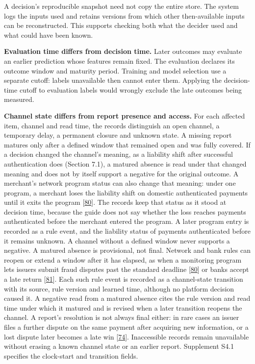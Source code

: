 \documentclass[
  11pt,
]{article}
\begin{document}
A decision's reproducible snapshot need not copy the entire store. The
system logs the inputs used and retains versions from which other
then-available inputs can be reconstructed. This supports checking both
what the decider used and what could have been known.

\textbf{Evaluation time differs from decision time.} Later outcomes may
evaluate an earlier prediction whose features remain fixed. The
evaluation declares its outcome window and maturity period. Training and
model selection use a separate cutoff: labels unavailable then cannot
enter them. Applying the decision-time cutoff to evaluation labels would
wrongly exclude the late outcomes being measured.

\textbf{Channel state differs from report presence and access.} For each
affected item, channel and read time, the records distinguish an open
channel, a temporary delay, a permanent closure and unknown state. A
missing report matures only after a defined window that remained open
and was fully covered. If a decision changed the channel's meaning, as a
liability shift after successful authentication does (Section 7.1), a
matured absence is read under that changed meaning and does not by
itself support a negative for the original outcome. A merchant's network
program status can also change that meaning: under one program, a
merchant loses the liability shift on domestic authenticated payments
until it exits the program
{[}\protect\hyperlink{ref-Stripe2026MonitoringPrograms}{80}{]}. The
records keep that status as it stood at decision time, because the guide
does not say whether the loss reaches payments authenticated before the
merchant entered the program. A later program entry is recorded as a
rule event, and the liability status of payments authenticated before it
remains unknown. A channel without a defined window never supports a
negative. A matured absence is provisional, not final. Network and bank
rules can reopen or extend a window after it has elapsed, as when a
monitoring program lets issuers submit fraud disputes past the standard
deadline {[}\protect\hyperlink{ref-Stripe2026MonitoringPrograms}{80}{]}
or banks accept a late return
{[}\protect\hyperlink{ref-Stripe2026ACHTerms}{81}{]}. Each such rule
event is recorded as a channel-state transition with its source, rule
version and learned time, although no platform decision caused it. A
negative read from a matured absence cites the rule version and read
time under which it matured and is revised when a later transition
reopens the channel. A report's resolution is not always final either:
in rare cases an issuer files a further dispute on the same payment
after acquiring new information, or a lost dispute later becomes a late
win {[}\protect\hyperlink{ref-Stripe2026Disputes}{74}{]}. Inaccessible
records remain unavailable without erasing a known channel state or an
earlier report. Supplement S4.1 specifies the clock-start and transition
fields.
\end{document}
